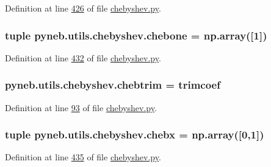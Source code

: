 Definition at line \hyperlink{chebyshev_8py_source_l00426}{426} of file \hyperlink{chebyshev_8py_source}{chebyshev.\-py}.

\hypertarget{namespacepyneb_1_1utils_1_1chebyshev_a26a6cedd505a161858435461e1645503}{
\subsubsection[{chebone}]{\setlength{\rightskip}{0pt plus 5cm}tuple pyneb.\-utils.\-chebyshev.\-chebone = np.\-array(\mbox{[}1\mbox{]})}}\label{namespacepyneb_1_1utils_1_1chebyshev_a26a6cedd505a161858435461e1645503}


Definition at line \hyperlink{chebyshev_8py_source_l00432}{432} of file \hyperlink{chebyshev_8py_source}{chebyshev.\-py}.

\hypertarget{namespacepyneb_1_1utils_1_1chebyshev_a66b8c25023851573f25dc418071de82b}{
\subsubsection[{chebtrim}]{\setlength{\rightskip}{0pt plus 5cm}pyneb.\-utils.\-chebyshev.\-chebtrim = trimcoef}}\label{namespacepyneb_1_1utils_1_1chebyshev_a66b8c25023851573f25dc418071de82b}


Definition at line \hyperlink{chebyshev_8py_source_l00093}{93} of file \hyperlink{chebyshev_8py_source}{chebyshev.\-py}.

\hypertarget{namespacepyneb_1_1utils_1_1chebyshev_a00f984b78341cd7920c46d1a6acacc5f}{
\subsubsection[{chebx}]{\setlength{\rightskip}{0pt plus 5cm}tuple pyneb.\-utils.\-chebyshev.\-chebx = np.\-array(\mbox{[}0,1\mbox{]})}}\label{namespacepyneb_1_1utils_1_1chebyshev_a00f984b78341cd7920c46d1a6acacc5f}


Definition at line \hyperlink{chebyshev_8py_source_l00435}{435} of file \hyperlink{chebyshev_8py_source}{chebyshev.\-py}.

